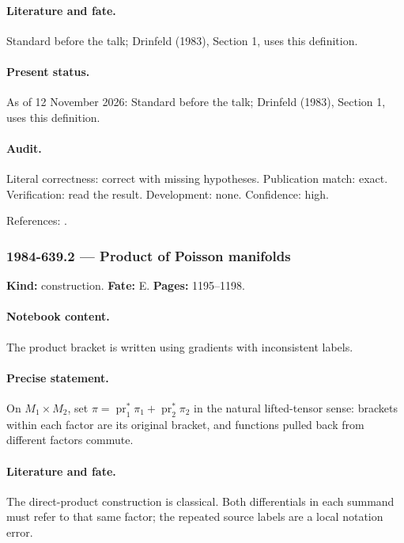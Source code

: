 \paragraph{Literature and fate.} Standard before the talk; Drinfeld (1983), Section 1, uses this definition.

\paragraph{Present status.} As of 12 November 2026: Standard before the talk; Drinfeld (1983), Section 1, uses this definition.

\paragraph{Audit.} Literal correctness: correct with missing hypotheses. Publication match: exact. Verification: read the result. Development: none. Confidence: high.

\noindent References: \citep{drinfeld1983hamiltonian}.\par

\subsubsection{1984-639.2 --- Product of Poisson manifolds}

\label{item:1984-639.2}

\noindent\textbf{Kind:} construction. \textbf{Fate:} E. \textbf{Pages:} 1195--1198.\par

\paragraph{Notebook content.} The product bracket is written using gradients with inconsistent labels.

\paragraph{Precise statement.} On \(M_1\times M_2\), set \(\pi=\operatorname{pr}_1^*\pi_1+\operatorname{pr}_2^*\pi_2\) in the natural lifted-tensor sense: brackets within each factor are its original bracket, and functions pulled back from different factors commute.

\paragraph{Literature and fate.} The direct-product construction is classical. Both differentials in each summand must refer to that same factor; the repeated source labels are a local notation error.

